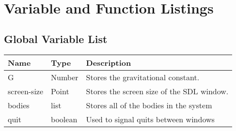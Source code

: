 \section{Variable and Function Listings}
\subsection{Global Variable List}
\begin{tabular}{p{}p{}p{}}
	Name & Type & Description \\ \hline
	G & Number & Stores the gravitational constant.\\
	screen-size & Point & Stores the screen size of the SDL window. \\
	bodies & list & Stores all of the bodies in the system \\
	quit & boolean & Used to signal quits between windows \\
\end{tabular}

